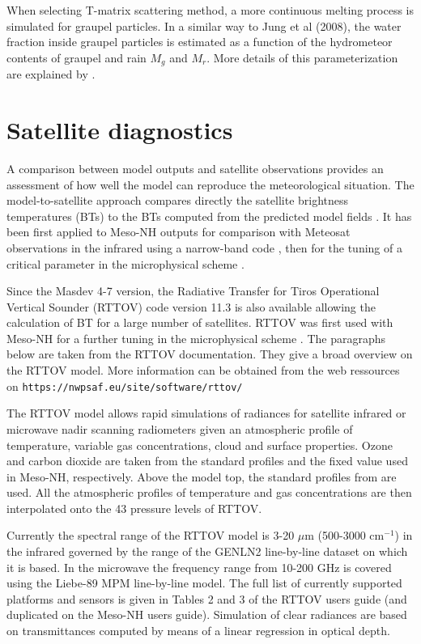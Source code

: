 \begin{description}
When selecting T-matrix scattering method, a more continuous melting process is simulated for graupel particles. 
In a similar way to Jung et al (2008), the water
fraction inside graupel particles is estimated as a function of the hydrometeor contents of graupel and rain $M_g$ and $M_r$.
More details of this parameterization are explained by \citet{Augros2016}. 
\end{description}

\section{Satellite diagnostics}
A comparison between model outputs and satellite observations provides an assessment of how well the model can reproduce the meteorological situation.
 The model-to-satellite approach compares directly the satellite brightness temperatures (BTs) to the BTs computed from the predicted model fields 
\citep{Morcrette1991}. It has been first applied to Meso-NH outputs for comparison
 with Meteosat observations in the infrared using a narrow-band code 
\citep{Chaboureau2000}, then for the tuning of a critical parameter in the microphysical scheme \citep{Chaboureau2002a}.

Since the Masdev 4-7 version, the Radiative Transfer for Tiros Operational Vertical Sounder (RTTOV) code version 11.3 \citep{Saunders2005} is also available
allowing the calculation of BT for a large number of satellites. RTTOV was first used with Meso-NH for a further tuning in the microphysical scheme \citep{Chaboureau2006}. The paragraphs below are taken from the RTTOV documentation. They give a broad overview on the RTTOV model. More information can be obtained from the web ressources on {\tt https://nwpsaf.eu/site/software/rttov/ }

The RTTOV model allows rapid simulations of radiances for satellite infrared or
microwave nadir scanning radiometers given an atmospheric profile of
temperature, variable gas concentrations, cloud and surface properties.
Ozone and carbon dioxide are taken from the \citet{McClatchey1972} standard
profiles and the fixed value used in Meso-NH, respectively. Above the model
top, the standard profiles from \citet{McClatchey1972} are used.
All the atmospheric profiles of temperature and gas concentrations are then
interpolated onto the 43 pressure levels of RTTOV.

Currently the spectral range of the RTTOV model is 3-20 $\mu$m (500-3000
cm$^{-1}$)  in the infrared governed by the range of the GENLN2
line-by-line dataset on which it is based.
In the microwave the frequency range from 10-200 GHz is covered using
the Liebe-89 MPM line-by-line model. The full list of currently
supported platforms and sensors is given in Tables 2 and 3 of
the RTTOV users guide (and duplicated on the Meso-NH users guide).
Simulation of clear radiances are based on transmittances computed by means
of a linear regression in optical depth.

